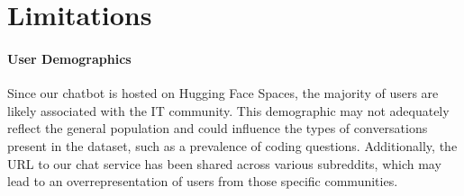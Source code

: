 \documentclass{article} %
\newcommand{\corpus}{\textsc{WildChat}\xspace}
\begin{document}





\section{Limitations}
\paragraph{User Demographics} Since our chatbot is hosted on Hugging Face Spaces, the majority of users are likely associated with the IT community. This demographic may not adequately reflect the general population and could influence the types of conversations present in the dataset, such as a prevalence of coding questions. Additionally, the URL to our chat service has been shared across various subreddits, which may lead to an overrepresentation of users from those specific communities.
\end{document}
